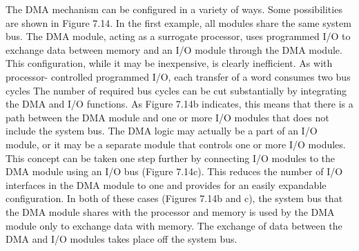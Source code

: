 The DMA mechanism can be configured in a variety of ways. Some possibilities
are shown in Figure 7.14. In the first example, all modules share the same system
bus. The DMA module, acting as a surrogate processor, uses programmed I/O to
exchange data between memory and an I/O module through the DMA module. This
configuration, while it may be inexpensive, is clearly inefficient. As with processor-
controlled programmed I/O, each transfer of a word consumes two bus cycles
The number of required bus cycles can be cut substantially by integrating the
DMA and I/O functions. As Figure 7.14b indicates, this means that there is a path
between the DMA module and one or more I/O modules that does not include
the system bus. The DMA logic may actually be a part of an I/O module, or it may
be a separate module that controls one or more I/O modules. This concept can
be taken one step further by connecting I/O modules to the DMA module using
an I/O bus (Figure 7.14c). This reduces the number of I/O interfaces in the DMA
module to one and provides for an easily expandable configuration. In both of
these cases (Figures 7.14b and c), the system bus that the DMA module shares with
the processor and memory is used by the DMA module only to exchange data with
memory. The exchange of data between the DMA and I/O modules takes place off
the system bus.

